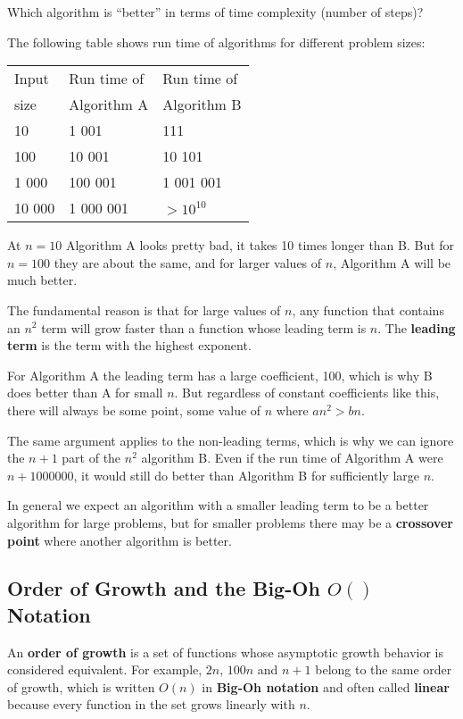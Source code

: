 \documentclass[11pt]{article}
\begin{document}
Which algorithm is ``better'' in terms of time complexity (number of steps)?

The following table shows run time of algorithms for different problem sizes:


\begin{center}
\begin{tabular}{lll}
 Input   &  Run time of  &  Run time of  \\
 size    &  Algorithm A  &  Algorithm B  \\
\hline
 10      &  1 001        &  111          \\
 100     &  10 001       &  10 101       \\
 1 000   &  100 001      &  1 001 001    \\
 10 000  &  1 000 001    &  $> 10^{10}$  \\
\end{tabular}
\end{center}



At $n = 10$ Algorithm A looks pretty bad, it takes 10 times longer
than B.  But for $n = 100$ they are about the same, and for larger
values of $n$, Algorithm A will be much better.  

The fundamental reason is that for large values of $n$, any function
that contains an $n^2$ term will grow faster than a function whose
leading term is $n$.  The \textbf{leading term} is the term with the
highest exponent.

For Algorithm A the leading term has a large coefficient, 100, which
is why B does better than A for small $n$. But regardless of constant
coefficients like this, there will always be some point, some value of
$n$ where $a n^2 > b n$.

The same argument applies to the non-leading terms, which is why we
can ignore the $n + 1$ part of the $n^2$ algorithm B.  Even if the
run time of Algorithm A were $n + 1000000$, it would still do better
than Algorithm B for sufficiently large $n$.

In general we expect an algorithm with a smaller leading term to be
a better algorithm for large problems, but for smaller problems there
may be a \textbf{crossover point} where another algorithm is better.
\subsection{Order of Growth and the Big-Oh $O()$ Notation}
\label{sec-1-2}

 
An \textbf{order of growth} is a set of functions whose asymptotic growth behavior
is considered equivalent.  For example, $2n$, $100n$ and $n + 1$ belong to
the same order of growth, which is written $O(n)$ in \textbf{Big-Oh notation} and
often called \textbf{linear} because every function in the set grows linearly with
$n$.
\end{document}
